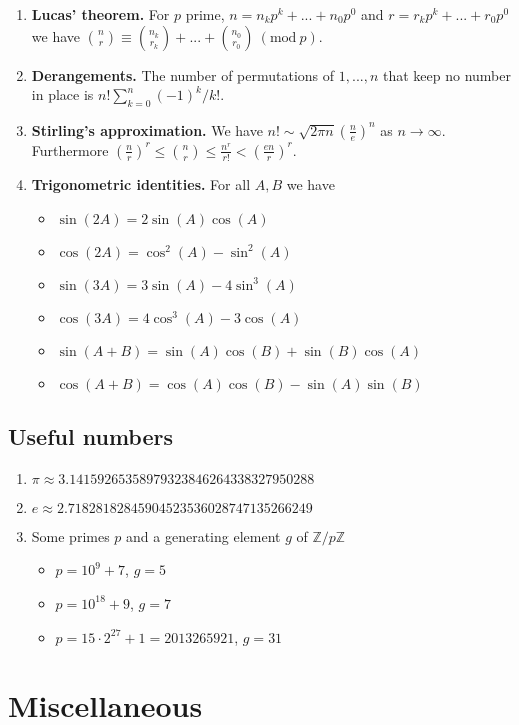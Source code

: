 \documentclass[
	a4paper,
	landscape,
	10pt,
	article
]{article}
\begin{document}
\begin{enumerate}
\item \textbf{Lucas' theorem.} For $p$ prime, $n=n_kp^k+...+n_0p^0$ and $r=r_kp^k+...+r_0p^0$ we have ${n\choose r}\equiv{n_k\choose r_k}+...+{n_0\choose r_0}\ (\mbox{mod}\ p)$.
\item \textbf{Derangements.} The number of permutations of $1,...,n$ that keep no number in place is $n!\sum_{k=0}^n(-1)^k/k!$.
\item \textbf{Stirling's approximation.} We have $n!\sim\sqrt{2\pi n}\left(\frac{n}e\right)^n$ as $n\to\infty$. Furthermore $\left(\frac{n}r\right)^r\leq{n\choose r}\leq\frac{n^r}{r!}<\left(\frac{en}r\right)^r$.
\item \textbf{Trigonometric identities.} For all $A,B$ we have
\begin{itemize}
\item $\sin(2A)=2\sin(A)\cos(A)$
\item $\cos(2A)=\cos^2(A)-\sin^2(A)$
\item $\sin(3A)=3\sin(A)-4\sin^3(A)$
\item $\cos(3A)=4\cos^3(A)-3\cos(A)$
\item $\sin(A+B)=\sin(A)\cos(B)+\sin(B)\cos(A)$
\item $\cos(A+B)=\cos(A)\cos(B)-\sin(A)\sin(B)$
\end{itemize}
\end{enumerate}

\subsection{Useful numbers}

\begin{enumerate}
\item $\pi\approx3.14159265358979323846264338327950288$
\item $e\approx2.71828182845904523536028747135266249$
\item Some primes $p$ and a generating element $g$ of $\mathbb{Z}/p\mathbb{Z}$
\begin{itemize}
\item $p=10^9+7$, $g=5$
\item $p=10^{18}+9$, $g=7$
\item $p=15\cdot2^{27}+1=2013265921$, $g=31$
\end{itemize}
\end{enumerate}

\section{Miscellaneous}
\end{document}
